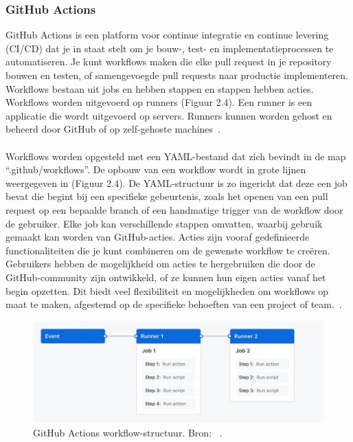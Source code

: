 \newpage

\subsubsection{GitHub Actions}

GitHub Actions is een platform voor continue integratie en continue levering (CI/CD) dat je in staat stelt om je bouw-, test- en implementatieprocessen te automatiseren. Je kunt workflows maken die elke pull request in je repository bouwen en testen, of samengevoegde pull requests naar productie implementeren. Workflows bestaan uit jobs en hebben stappen en stappen hebben acties. Workflows worden uitgevoerd op runners (Figuur 2.4). Een runner is een applicatie die wordt uitgevoerd op servers. Runners kunnen worden gehost en beheerd door GitHub of op zelf-gehoste machines~\autocite{githubActionsIntro}.
\\\\
Workflows worden opgesteld met een YAML-bestand dat zich bevindt in de map “.github/workflows”. De opbouw van een workflow wordt in grote lijnen weergegeven in (Figuur 2.4). De YAML-structuur is zo ingericht dat deze een job bevat die begint bij een specifieke gebeurtenis, zoals het openen van een pull request op een bepaalde branch of een handmatige trigger van de workflow door de gebruiker. Elke job kan verschillende stappen omvatten, waarbij gebruik gemaakt kan worden van GitHub-acties. Acties zijn vooraf gedefinieerde functionaliteiten die je kunt combineren om de gewenste workflow te creëren. Gebruikers hebben de mogelijkheid om acties te hergebruiken die door de GitHub-community zijn ontwikkeld, of ze kunnen hun eigen acties vanaf het begin opzetten. Dit biedt veel flexibiliteit en mogelijkheden om workflows op maat te maken, afgestemd op de specifieke behoeften van een project of team.~\autocite{githubActionsIntro}.

\begin{figure}[H]
    \centering
    \includegraphics[width=0.8\linewidth]{Foto's/overview-actions-simple.png}
    \caption{GitHub Actions workflow-structuur. Bron: ~\autocite{githubActionsIntro}.}
    \label{fig:workflow-structuur}
\end{figure}

